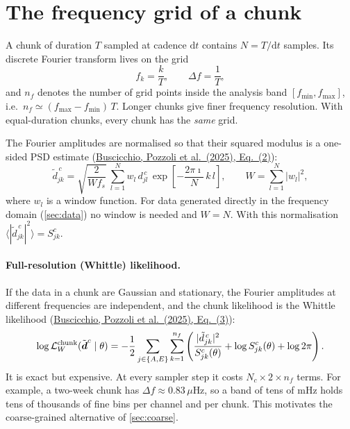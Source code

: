 \documentclass[11pt,a4paper]{article}
\newcommand{\urlPone}{https://arxiv.org/pdf/2511.03604}
\newcommand{\PoneEq}[1]{\href{\urlPone}{Buscicchio, Pozzoli et al.~(2025), Eq.~(#1)}}
\newcommand{\dd}{\mathrm{d}}
\begin{document}
\section{The frequency grid of a chunk}\label{sec:grid}

A chunk of duration $T$ sampled at cadence $\dd t$ contains $N = T/\dd t$ samples.
Its discrete Fourier transform lives on the grid
\begin{equation}
  f_k = \frac{k}{T}, \qquad \Delta f = \frac{1}{T},
\end{equation}
and $n_f$ denotes the number of grid points inside the analysis band
$[f_{\min},f_{\max}]$, i.e.\ $n_f \simeq (f_{\max}-f_{\min})\,T$. Longer chunks give
finer frequency resolution. With equal-duration chunks, every chunk has the
\emph{same} grid.

The Fourier amplitudes are normalised so that their squared modulus is a one-sided
PSD estimate (\PoneEq{2}):
\begin{equation}
  \tilde d^{\,c}_{jk} = \sqrt{\frac{2}{W f_s}}\ \sum_{l=1}^{N} w_l\, d^{\,c}_{jl}\,
  \exp\!\left[-\frac{2\pi\imath}{N}\,k\,l\right],
  \qquad W=\sum_{l=1}^N |w_l|^2,
  \label{eq:dft}
\end{equation}
where $w_l$ is a window function. For data generated directly in the frequency
domain (\cref{sec:data}) no window is needed and $W=N$. With this normalisation
$\langle|\tilde d^{\,c}_{jk}|^2\rangle = S^c_{jk}$.

\paragraph{Full-resolution (Whittle) likelihood.}
If the data in a chunk are Gaussian and stationary, the Fourier amplitudes at
different frequencies are independent, and the chunk likelihood is the Whittle
likelihood (\PoneEq{3}):
\begin{equation}
  \log\mathcal{L}^{\rm chunk}_W(\tilde{\boldsymbol d}^c\mid\theta) =
  -\frac12 \sum_{j\in\{A,E\}} \sum_{k=1}^{n_f}
  \left( \frac{|\tilde d^{\,c}_{jk}|^2}{S^c_{jk}(\theta)} + \log S^c_{jk}(\theta) + \log 2\pi \right).
  \label{eq:whittle}
\end{equation}
It is exact but expensive. At every sampler step it costs
$N_c\times 2\times n_f$ terms. For example, a two-week chunk has
$\Delta f\approx 0.83\,\mu$Hz, so a band of tens of mHz holds tens of thousands of
fine bins per channel and per chunk. This motivates the coarse-grained alternative
of \cref{sec:coarse}.
\end{document}
